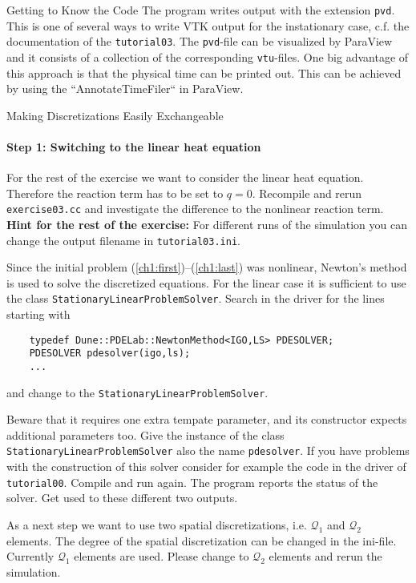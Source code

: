 \documentclass[12pt,a4paper]{article}
\begin{document}
\begin{Exercise}{Getting to Know the Code}
  The program writes output with the extension \lstinline!pvd!. This is one
  of several ways to write VTK output for the instationary case,
  c.f. the documentation of the \lstinline!tutorial03!. The
  \lstinline!pvd!-file can be visualized by ParaView and it consists of
  a collection of the corresponding \lstinline!vtu!-files.
  One big advantage of this approach is that the physical time can be
  printed out. This can be achieved by using the ``AnnotateTimeFiler``
  in ParaView.
\end{Exercise}

\begin{Exercise}{Making Discretizations Easily Exchangeable}
  \vspace{-2em}
  \paragraph{Step 1: Switching to the linear heat equation}
  For the rest of the exercise we want to consider the linear heat
  equation. Therefore the reaction term has to be set to $q =
  0$. Recompile and rerun \lstinline!exercise03.cc! and investigate the
  difference to the nonlinear reaction term. \newline
  \textbf{Hint for the rest of the exercise:} For different runs of the
  simulation you can change the output filename in
  \lstinline!tutorial03.ini!.

  Since the initial problem (\ref{ch1:first})--(\ref{ch1:last}) was
  nonlinear, Newton's method is used to solve the discretized
  equations. For the linear case it is sufficient to use the class
  \lstinline!StationaryLinearProblemSolver!. Search in the driver for
  the lines starting with
  \begin{lstlisting}
    typedef Dune::PDELab::NewtonMethod<IGO,LS> PDESOLVER;
    PDESOLVER pdesolver(igo,ls);
    ...
  \end{lstlisting}
  and change to the \lstinline!StationaryLinearProblemSolver!.

  Beware that it requires one extra tempate parameter, and its
  constructor expects additional parameters too. Give the instance
  of the class \mbox{\lstinline!StationaryLinearProblemSolver!} also
  the name \lstinline!pdesolver!. If you have problems with the
  construction of this solver consider for example the code in the
  driver of \lstinline!tutorial00!. Compile and run again. The program
  reports the status of the solver. Get used to these different two
  outputs.

  As a next step we want to use two spatial discretizations,
  i.e. $\mathcal{Q}_1$ and $\mathcal{Q}_2$ elements. The degree of the
  spatial discretization can be changed in the ini-file. Currently
  $\mathcal{Q}_1$ elements are used. Please change to $\mathcal{Q}_2$
  elements and rerun the simulation.


\end{Exercise}
\end{document}
